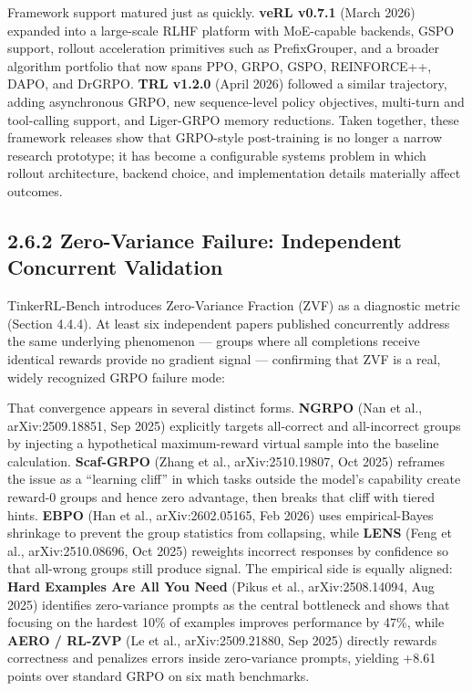 \documentclass[
  american,
  11pt,
  a4paper,
  oneside]{report}
\begin{document}
Framework support matured just as quickly. \textbf{veRL v0.7.1} (March
2026) expanded into a large-scale RLHF platform with MoE-capable
backends, GSPO support, rollout acceleration primitives such as
PrefixGrouper, and a broader algorithm portfolio that now spans PPO,
GRPO, GSPO, REINFORCE++, DAPO, and DrGRPO. \textbf{TRL v1.2.0} (April
2026) followed a similar trajectory, adding asynchronous GRPO, new
sequence-level policy objectives, multi-turn and tool-calling support,
and Liger-GRPO memory reductions. Taken together, these framework
releases show that GRPO-style post-training is no longer a narrow
research prototype; it has become a configurable systems problem in
which rollout architecture, backend choice, and implementation details
materially affect outcomes.

\subsection{2.6.2 Zero-Variance Failure: Independent Concurrent
Validation}\label{zero-variance-failure-independent-concurrent-validation}

TinkerRL-Bench introduces Zero-Variance Fraction (ZVF) as a diagnostic
metric (Section 4.4.4). At least six independent papers published
concurrently address the same underlying phenomenon --- groups where all
completions receive identical rewards provide no gradient signal ---
confirming that ZVF is a real, widely recognized GRPO failure mode:

That convergence appears in several distinct forms. \textbf{NGRPO} (Nan
et al., arXiv:2509.18851, Sep 2025) explicitly targets all-correct and
all-incorrect groups by injecting a hypothetical maximum-reward virtual
sample into the baseline calculation. \textbf{Scaf-GRPO} (Zhang et al.,
arXiv:2510.19807, Oct 2025) reframes the issue as a ``learning cliff''
in which tasks outside the model's capability create reward-0 groups and
hence zero advantage, then breaks that cliff with tiered hints.
\textbf{EBPO} (Han et al., arXiv:2602.05165, Feb 2026) uses
empirical-Bayes shrinkage to prevent the group statistics from
collapsing, while \textbf{LENS} (Feng et al., arXiv:2510.08696, Oct
2025) reweights incorrect responses by confidence so that all-wrong
groups still produce signal. The empirical side is equally aligned:
\textbf{Hard Examples Are All You Need} (Pikus et al., arXiv:2508.14094,
Aug 2025) identifies zero-variance prompts as the central bottleneck and
shows that focusing on the hardest 10\% of examples improves performance
by 47\%, while \textbf{AERO / RL-ZVP} (Le et al., arXiv:2509.21880, Sep
2025) directly rewards correctness and penalizes errors inside
zero-variance prompts, yielding +8.61 points over standard GRPO on six
math benchmarks.
\end{document}
